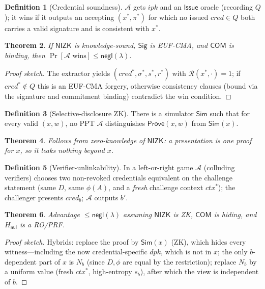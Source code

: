 \documentclass[11pt]{article}
\theoremstyle{plain}
\newtheorem{theorem}{Theorem}
\theoremstyle{definition}
\newtheorem{definition}[theorem]{Definition}
\begin{document}
\begin{definition}[Credential soundness]\label{def:sound}
$\mathcal{A}$ gets $\mathit{ipk}$ and an $\mathsf{Issue}$ oracle (recording $Q$); it
wins if it outputs an accepting $(x^*,\pi^*)$ for which no issued $\mathit{cred}\in Q$
both carries a valid signature and is consistent with $x^*$.
\end{definition}
\begin{theorem}\label{thm:sound}
If $\mathsf{NIZK}$ is knowledge-sound, $\mathsf{Sig}$ is EUF-CMA, and $\mathsf{COM}$ is
binding, then $\Pr[\mathcal{A}\text{ wins}]\le\mathsf{negl}(\lambda)$.
\end{theorem}
\begin{proof}[Proof sketch] The extractor yields $(\mathit{cred}^*,\sigma^*,s^*,r^*)$
with $\mathcal{R}(x^*,\cdot)=1$; if $\mathit{cred}^*\notin Q$ this is an EUF-CMA
forgery, otherwise consistency clauses (bound via the signature and commitment
binding) contradict the win condition. \end{proof}

\begin{definition}[Selective-disclosure ZK]\label{def:zk}
There is a simulator $\mathsf{Sim}$ such that for every valid $(x,w)$, no PPT
$\mathcal{A}$ distinguishes $\mathsf{Prove}(x,w)$ from $\mathsf{Sim}(x)$.
\end{definition}
\begin{theorem}\label{thm:zk}
Follows from zero-knowledge of $\mathsf{NIZK}$: a presentation is one proof for $x$, so
it leaks nothing beyond $x$.
\end{theorem}

\begin{definition}[Verifier-unlinkability]\label{def:vunlink}
In a left-or-right game $\mathcal{A}$ (colluding verifiers) chooses two non-revoked
credentials equivalent on the challenge statement (same $D$, same $\phi(A)$, and a
\emph{fresh} challenge context $\mathit{ctx}^*$); the challenger presents
$\mathit{cred}_b$; $\mathcal{A}$ outputs $b'$.
\end{definition}
\begin{theorem}\label{thm:vunlink}
Advantage $\le\mathsf{negl}(\lambda)$ assuming $\mathsf{NIZK}$ is ZK, $\mathsf{COM}$ is
hiding, and $H_{\mathsf{nul}}$ is a RO/PRF.
\end{theorem}
\begin{proof}[Proof sketch] Hybrids: replace the proof by $\mathsf{Sim}(x)$ (ZK), which
hides every witness---including the now credential-specific $\mathit{dpk}$, which is not
in $x$; the only $b$-dependent part of $x$ is $N_b$ (since $D,\phi$ are equal by the
restriction); replace $N_b$ by a uniform value (fresh $\mathit{ctx}^*$, high-entropy
$s_b$), after which the view is independent of $b$. \end{proof}
\end{document}
